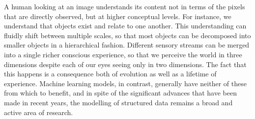 %
%
%

A human looking at an image understands its content not in terms of the pixels that are directly observed, but at higher conceptual levels.
For instance, we understand that objects exist and relate to one another. 
This understanding can fluidly shift between multiple scales, so that most objects can be decomposed into smaller objects in a hierarchical fashion. 
Different sensory streams can be merged into a single richer conscious experience, so that we perceive the world in three dimensions despite each of our eyes seeing only in two dimensions. 
The fact that this happens is a consequence both of evolution as well as a lifetime of experience.
Machine learning models, in contrast, generally have neither of these from which to benefit,
and in spite of the significant advances that have been made in recent years, the modelling of structured data remains a broad and active area of research.

